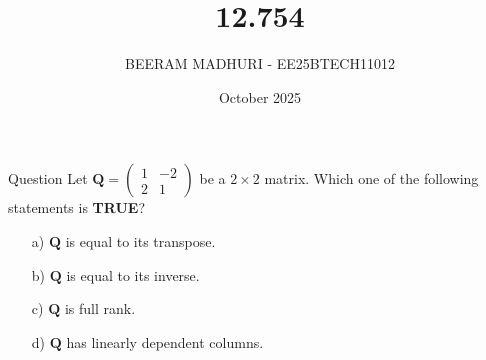 \documentclass{beamer}
\title %
{12.754}
\date{October  2025}
\author %
{BEERAM MADHURI - EE25BTECH11012}
\begin{document}
\frame{\titlepage}
\begin{frame}{Question}
Let $\mathbf{Q} = \begin{pmatrix} 1 & -2 \\ 2 & 1 \end{pmatrix}$ be a $2\times2$ matrix. Which one of the following statements is \textbf{TRUE}?

\begin{enumerate}
    \item[a)] $\mathbf{Q}$ is equal to its transpose.
    \item[b)] $\mathbf{Q}$ is equal to its inverse.
    \item[c)] $\mathbf{Q}$ is full rank.
    \item[d)] $\mathbf{Q}$ has linearly dependent columns.
\end{enumerate}
\end{frame}
 
\end{document}
